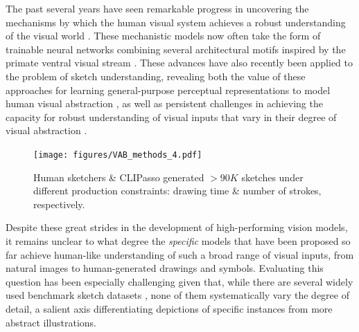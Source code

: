 \documentclass[10pt,letterpaper]{article}
\begin{document}
The past several years have seen remarkable progress in uncovering the mechanisms by which the human visual system achieves a robust understanding of the visual world \cite{yamins2014performance, kriegeskorte2015deep, zhuang2021unsupervised, konkle2022self}. 
These mechanistic models now often take the form of trainable neural networks combining several architectural motifs inspired by the primate ventral visual stream 
\cite{gross1972visual,goodale1992separate,malach2002topography,hung2005fast}. %
These advances have also recently been applied to the problem of sketch understanding, revealing both the value of these approaches for learning general-purpose perceptual representations to model human visual abstraction \cite{fan2018common, yu2017sketch, kubilius2016deep}, as well as persistent challenges in achieving the capacity for robust understanding of visual inputs that vary in their degree of visual abstraction \cite{baker2018abstract, singer2022photos, fan2020pragmatic}.

\begin{figure}
    \centering
    \texttt{[image: figures/VAB\_methods\_4.pdf]}
    \vspace{-0.5em}
    \caption{Human sketchers \& CLIPasso generated $>90K$ sketches under different production constraints: drawing time \& number of strokes, respectively.}
    \label{fig:example_gallery}
    \vspace{-1.5em}
\end{figure}

Despite these great strides in the development of high-performing vision models, it remains unclear to what degree the \textit{specific} models that have been proposed so far achieve human-like understanding of such a broad range of visual inputs, from natural images to human-generated drawings and symbols.
Evaluating this question has been especially challenging given that, while there are several widely used benchmark sketch datasets \cite{eitz2012sketch, jongejan2017quick, sangkloy2016sketchy}, none of them systematically vary the degree of detail, a salient axis differentiating depictions of specific instances from more abstract illustrations. %
\end{document}
